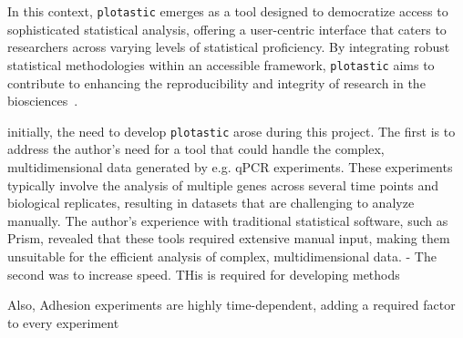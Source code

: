 In this context, \texttt{plotastic} emerges as a tool designed to democratize access to
sophisticated statistical analysis, offering a user-centric interface that
caters to researchers across varying levels of statistical proficiency. By
integrating robust statistical methodologies within an accessible framework,
\texttt{plotastic} aims to contribute to enhancing the reproducibility and
integrity of research in the biosciences~\cite{gomez-cabreroDataIntegrationEra2014}.



initially, the need to develop \texttt{plotastic} arose during this project. The
first is to address the author's need for a tool that could handle the complex,
multidimensional data generated by e.g. qPCR experiments. These experiments
typically involve the analysis of multiple genes across several time points and
biological replicates, resulting in datasets that are challenging to analyze
manually. The author's experience with traditional statistical software, such
as Prism, revealed that these tools required extensive manual input, making
them unsuitable for the efficient analysis of complex, multidimensional data. -
The second was to increase speed. THis is required for developing methods

Also, Adhesion experiments are highly time-dependent, adding a required factor to every experiment

